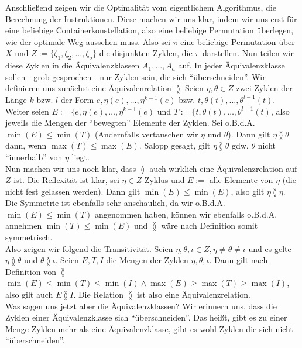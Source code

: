 Anschließend zeigen wir die Optimalität vom eigentlichem Algorithmus, die Berechnung der Instruktionen.
Diese machen wir uns klar, indem wir uns erst für eine beliebige Containerkonstellation, also eine beliebige Permutation überlegen, wie der optimale Weg aussehen muss.
Also sei $\pi$ eine beliebige Permutation über $X$ und $Z := \{\zeta_1, \zeta_2, \dots, \zeta_o\}$ die disjunkten Zyklen, die $\pi$ darstellen.
Nun teilen wir diese Zyklen in die Äquivalenzklassen $A_1, \dots, A_a$ auf.
In jeder Äquivalenzklasse sollen - grob gesprochen - nur Zyklen sein, die sich ``überschneiden''.
Wir definieren uns zunächst eine Äquivalenrelation $\between$
Seien $\eta,\theta \in Z$ zwei Zyklen der Länge $k$ bzw. $l$ der Form $e, \eta(e), \dots, \eta^{k-1}(e)$ bzw. $t, \theta(t), \dots, \theta^{l-1}(t)$.
Weiter seien $E := \{e, \eta(e), \dots, \eta^{k-1}(e)$ und $T := \{t, \theta(t), \dots, \theta^{l-1}(t)$, also jeweils die Mengen der ``bewegten'' Elemente der Zyklen.
Sei o.B.d.A. $\min(E) \leq \min(T)$ (Andernfalls vertauschen wir $\eta$ und $\theta$). Dann gilt $\eta \between \theta$ dann, wenn $\max(T) \leq \max(E)$.
Salopp gesagt, gilt $\eta \between \theta$ gdw. $\theta$ nicht ``innerhalb'' von $\eta$ liegt. \\
Nun machen wir uns noch klar, dass $\between$ auch wirklich eine Äquivalenzrelation auf $Z$ ist.
Die Reflexität ist klar, sei $\eta \in Z$ Zyklus und $E := $ alle Elemente von $\eta$ (die nicht fest gelassen werden).
Dann gilt $\min(E) \leq \min(E)$, also gilt $\eta \between \eta$.\\
Die Symmetrie ist ebenfalls sehr anschaulich, da wir o.B.d.A. $\min(E) \leq \min(T)$ angenommen haben,
können wir ebenfalls o.B.d.A. annehmen $\min(T) \leq \min(E)$ und $\between$ wäre nach Definition somit symmetrisch.\\
Also zeigen wir folgend die Transitivität.
Seien $\eta, \theta, \iota \in Z, \eta \neq \theta \neq \iota$ und es gelte $\eta \between \theta$ und $\theta \between \iota$.
Seien $E,T,I$ die Mengen der Zyklen $\eta, \theta, \iota$.
Dann gilt nach Definition von $\between$ $\min(E) \leq \min(T) \leq \min(I) \wedge \max(E) \geq \max(T) \geq \max(I)$, also gilt auch $E \between I$.
Die Relation $\between$ ist also eine Äquivalenzrelation.\\
Was sagen uns jetzt aber die Äquivalenzklassen? Wir erinnern uns, dass die Zyklen einer Äquivalenzklasse sich ``überschneiden''.
Das heißt, gibt es zu einer Menge Zyklen mehr als eine Äquivalenzklasse, gibt es wohl Zyklen die sich nicht ``überschneiden''.\\

